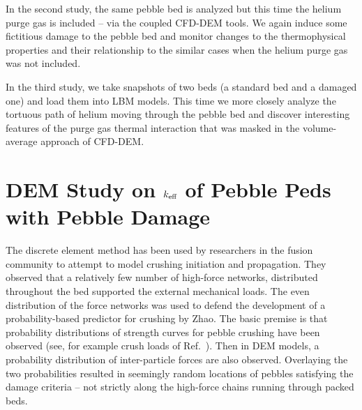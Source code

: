 In the second study, the same pebble bed is analyzed but this time the helium purge gas is included -- via the coupled CFD-DEM tools. We again induce some fictitious damage to the pebble bed and monitor changes to the thermophysical properties and their relationship to the similar cases when the helium purge gas was not included.

In the third study, we take snapshots of two beds (a standard bed and a damaged one) and load them into LBM models. This time we more closely analyze the tortuous path of helium moving through the pebble bed and discover interesting features of the purge gas thermal interaction that was masked in the volume-average approach of CFD-DEM.









\section{DEM Study on $k_\text{eff}$ of Pebble Peds with Pebble Damage}\label{sec:dem-studies-effective-conductivity}


The discrete element method has been used by researchers in the fusion community to attempt to model crushing initiation and propagation\cite{Annabattula2012a, Zhao2012, Zhao2013}. They observed that a relatively few number of high-force networks, distributed throughout the bed supported the external mechanical loads. The even distribution of the force networks was used to defend the development of a probability-based predictor for crushing by Zhao\etal.\cite{Zhao2013} The basic premise is that probability distributions of strength curves for pebble crushing have been observed (see, for example crush loads of Ref.~\cite{Tsuchiya1998}). Then in DEM models, a probability distribution of inter-particle forces are also observed. Overlaying the two probabilities resulted in seemingly random locations of pebbles satisfying the damage criteria -- not strictly along the high-force chains running through packed beds.

